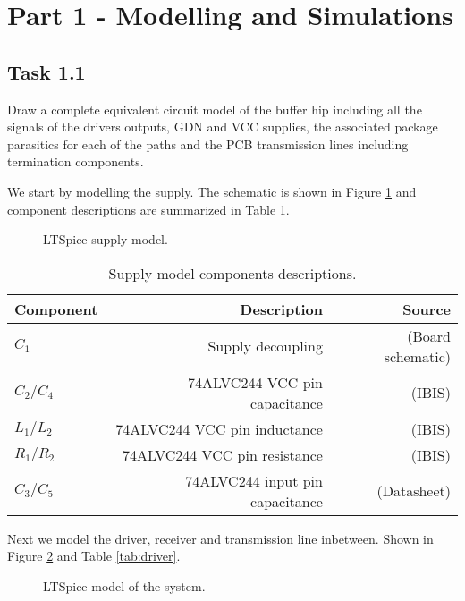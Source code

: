 \documentclass[../main.tex]{subfiles}
\begin{document}
\section{Part 1 - Modelling and Simulations}

\subsection{Task 1.1}

Draw a complete equivalent circuit model of the buffer hip including all the signals of the drivers outputs, GDN and VCC supplies, the associated package parasitics for each of the paths and the PCB transmission lines including termination components.

\solution

We start by modelling the supply. The schematic is shown in Figure \ref{fig:supply} and component descriptions are summarized in Table \ref{tab:supply}.

\begin{figure}[h]
    \centering
    \caption{LTSpice supply model.}
    \label{fig:supply}
\end{figure}

\begin{table}[h]
    \centering
    \begin{tabular}{l|r r}
        \toprule[1pt]
        \textbf{Component} & \textbf{Description} & \textbf{Source}\\
        \midrule
        $C_1$       & Supply decoupling & (Board schematic) \\
        $C_2/C_4$   & 74ALVC244 VCC pin capacitance & (IBIS) \\
        $L_1/L_2$   & 74ALVC244 VCC pin inductance & (IBIS) \\
        $R_1/R_2$   & 74ALVC244 VCC pin resistance & (IBIS) \\
        $C_3/C_5$   & 74ALVC244 input pin capacitance & (Datasheet) \\
        \bottomrule[1pt]
    \end{tabular}
    \caption{Supply model components descriptions.}
    \label{tab:supply}
\end{table}

Next we model the driver, receiver and transmission line inbetween. Shown in Figure \ref{fig:driver} and Table \ref{tab:driver}.

\begin{figure}[h]
    \centering
    \caption{LTSpice model of the system.}
    \label{fig:driver}
\end{figure}
\end{document}
